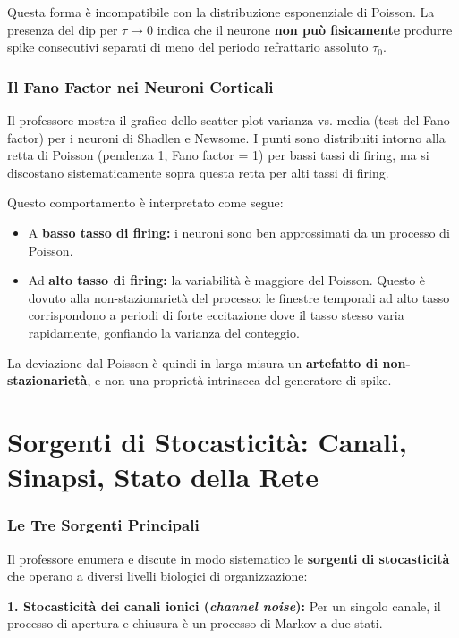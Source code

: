 Questa forma è incompatibile con la distribuzione esponenziale di Poisson. La presenza del dip per $\tau \to 0$ indica che il neurone \textbf{non può fisicamente} produrre spike consecutivi separati di meno del periodo refrattario assoluto $\tau_0$.

\subsubsection{Il Fano Factor nei Neuroni Corticali}

Il professore mostra il grafico dello scatter plot varianza vs. media (test del Fano factor) per i neuroni di Shadlen e Newsome. I punti sono distribuiti intorno alla retta di Poisson (pendenza 1, Fano factor = 1) per bassi tassi di firing, ma si discostano sistematicamente sopra questa retta per alti tassi di firing.

Questo comportamento è interpretato come segue:
\begin{itemize}
    \item A \textbf{basso tasso di firing:} i neuroni sono ben approssimati da un processo di Poisson.
    \item Ad \textbf{alto tasso di firing:} la variabilità è maggiore del Poisson. Questo è dovuto alla non-stazionarietà del processo: le finestre temporali ad alto tasso corrispondono a periodi di forte eccitazione dove il tasso stesso varia rapidamente, gonfiando la varianza del conteggio.
\end{itemize}

La deviazione dal Poisson è quindi in larga misura un \textbf{artefatto di non-stazionarietà}, e non una proprietà intrinseca del generatore di spike.


\section{Sorgenti di Stocasticità: Canali, Sinapsi, Stato della Rete}

\subsubsection{Le Tre Sorgenti Principali}

Il professore enumera e discute in modo sistematico le \textbf{sorgenti di stocasticità} che operano a diversi livelli biologici di organizzazione:

\textbf{1. Stocasticità dei canali ionici (\textit{channel noise}):} Per un singolo canale, il processo di apertura e chiusura è un processo di Markov a due stati.

